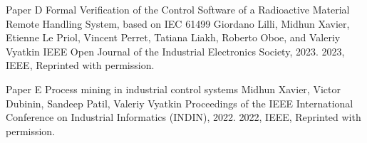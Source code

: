 \documentclass[12pt,a4paper,openright,final,twoside]{cseethesis}
\begin{document}
\def\paperheader{Paper D}
\def\papertitle{Formal Verification of the Control Software of a Radioactive Material Remote Handling System, based on IEC 61499}
\def\paperauthorstring{Giordano Lilli, Midhun Xavier, Etienne Le Priol, Vincent Perret, Tatiana Liakh, Roberto Oboe, and Valeriy Vyatkin}
\def\referencestring{IEEE Open Journal of the Industrial Electronics Society, 2023.}
\def\copyrightstring{2023, IEEE, Reprinted with permission.}


\makepaperaccepted
  {\paperheader}
  {\papertitle}
  {\paperauthorstring}
  {\referencestring}
  {\copyrightstring}



\def\paperheader{Paper E}
\def\papertitle{Process mining in industrial control systems}
\def\paperauthorstring{Midhun Xavier, Victor Dubinin, Sandeep Patil, Valeriy Vyatkin}
\def\referencestring{Proceedings of the IEEE International Conference on Industrial Informatics (INDIN), 2022.}
\def\copyrightstring{2022, IEEE, Reprinted with permission.}


\makepaperaccepted
  {\paperheader}
  {\papertitle}
  {\paperauthorstring}
  {\referencestring}
  {\copyrightstring}



\def\paperheader{Paper F}
\def\papertitle{An interactive learning approach on digital twin for deriving the controller logic in IEC 61499 standard}
\def\paperauthorstring{Midhun Xavier, Victor Dubinin, Sandeep Patil, Valeriy Vyatkin}
\def\referencestring{Proceedings of the IEEE International Conference on Emerging Technologies and Factory Automation (ETFA), 2022.}
\def\copyrightstring{2022, IEEE, Reprinted with permission.}
\end{document}
